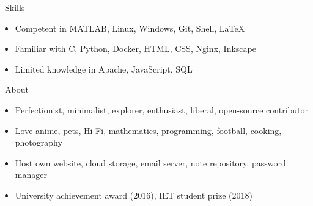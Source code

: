 \documentclass{resume}
\begin{document}
\begin{section}{\faTasks\ Skills}
	\begin{itemize}[noitemsep,nolistsep]
		\item Competent in MATLAB, Linux, Windows, Git, Shell, \LaTeX
		\item Familiar with C, Python, Docker, HTML, CSS, Nginx, Inkscape
		\item Limited knowledge in Apache, JavaScript, SQL
	\end{itemize}
\end{section}

\begin{section}{\faHeartO\ About}
	\begin{itemize}[noitemsep,nolistsep]
		\item Perfectionist, minimalist, explorer, enthusiast, liberal, open-source contributor
		\item Love anime, pets, Hi-Fi, mathematics, programming, football, cooking, photography
		\item Host own website, cloud storage, email server, note repository, password manager
		\item University achievement award (2016), IET student prize (2018)
	\end{itemize}
\end{section}

\updateinfo
\end{document}
